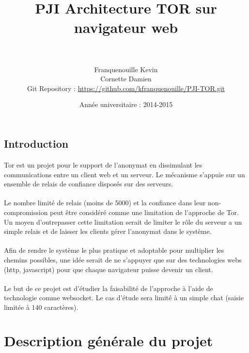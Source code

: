 \documentclass[a4paper,12pt]{report}
\title{	
		\horrule{0.5pt} \\[0.5cm]
		\huge PJI Architecture TOR sur\\ navigateur web \\
		\horrule{0.5pt} \\[0.5cm]
}
\author{
		\normalfont 								\normalsize
        Franquenouille Kevin\\[-3pt]		\normalsize
       	Cornette Damien\\[-3pt]		\normalsize
       	Git Repository : \url{https://github.com/kfranquenouille/PJI-TOR.git} \\[-3pt]		\normalsize
}
\date{
		\normalfont 								\normalsize
        Année universitaire : 2014-2015\\[-3pt]		\normalsize
}
\begin{document}
\maketitle	

\newpage
\begin{center}
\section*{Introduction}
\end{center}
\paragraph{}
Tor est un projet pour le support de l'anonymat en dissimulant les communications entre un client web et un serveur. Le mécanisme s'appuie sur un ensemble de relais de confiance disposés sur des serveurs. 
\paragraph{} 
Le nombre limité de relais (moins de 5000) et la confiance dans leur non-compromission peut être considéré comme une limitation de l'approche de Tor. Un moyen d'outrepasser cette limitation serait de limiter le rôle du serveur a un simple relais et de laisser les clients gérer l'anonymat dans le système. 
\paragraph{}
Afin de rendre le système le plus pratique et adoptable pour multiplier les chemins possibles, une idée serait de ne s'appuyer que sur des technologies webs (http, javascript) pour que chaque navigateur puisse devenir un client.
\paragraph{}
Le but de ce projet est d'étudier la faisabilité de l'approche à l'aide de technologie comme websocket. Le cas d'étude sera limité à un simple chat (saisie limitée à 140 caractères).


\tableofcontents

\newpage
\section{Description générale du projet}
\end{document}
